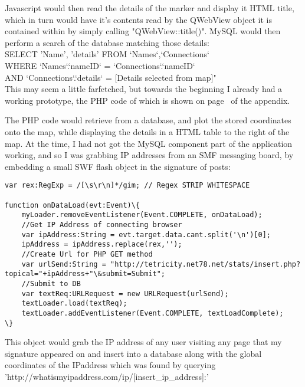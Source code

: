 Javascript would then read the details of the marker and display it HTML title, which in turn would have it's contents read by the QWebView object it is contained within by simply calling "QWebView::title()". MySQL would then perform a search of the database matching those details:\\

 SELECT 'Name', 'details' FROM `Names`,`Connections`\\
\tab WHERE `Names`.`nameID` = `Connections`.`nameID`\\
\tab AND `Connections`.`details` = [Details selected from map]"\\

This may seem a little farfetched, but towards the beginning I already had a working prototype, the PHP code of which is shown on page~\pageref{gmaps} of the appendix.

The PHP code would retrieve from a database, and plot the stored coordinates onto the map, while displaying the details in a HTML table to the right of the map. At the time, I had not got the MySQL component part of the application working, and so I was grabbing IP addresses from an SMF messaging board, by embedding a small SWF flash object in the signature of posts:

\begin{lstlisting}[title=\bf Snippet from counter.fla]
var rex:RegExp = /[\s\r\n]*/gim; // Regex STRIP WHITESPACE

function onDataLoad(evt:Event)\{
	myLoader.removeEventListener(Event.COMPLETE, onDataLoad);
	//Get IP Address of connecting browser
	var ipAddress:String = evt.target.data.cant.split('\n')[0];
	ipAddress = ipAddress.replace(rex,'');
	//Create Url for PHP GET method
	var urlSend:String = "http://tetricity.net78.net/stats/insert.php?topical="+ipAddress+"\&submit=Submit";
	//Submit to DB
	var textReq:URLRequest = new URLRequest(urlSend);
	textLoader.load(textReq);
	textLoader.addEventListener(Event.COMPLETE, textLoadComplete);
\}
\end{lstlisting}
This object would grab the IP address of any user visiting any page that my signature appeared on and insert into a database along with the global coordinates of the IPaddress which was found by querying 'http://whatismyipaddress.com/ip/[insert\_ip\_address]:'


